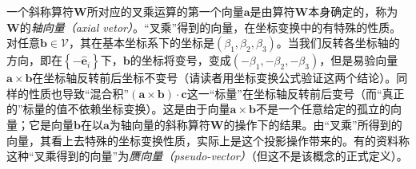 \documentclass[main.tex]{subfiles}
\begin{document}
一个斜称算符$\mathbf{W}$所对应的叉乘运算的第一个向量$\mathbf{a}$是由算符$\mathbf{W}$本身确定的，称为$\mathbf{W}$的\emph{轴向量（axial vetor）}。“叉乘”得到的向量，在坐标变换中的有特殊的性质。对任意$\mathbf{b}\in\mathcal{V}$，其在基本坐标系下的坐标是$\left(\beta_1,\beta_2,\beta_3\right)$。当我们反转各坐标轴的方向，即在$\left\{-\mathbf{\hat{e}}_i\right\}$下，$\mathbf{b}$的坐标将变号，变成$\left(-\beta_1,-\beta_2,-\beta_3\right)$，但是易验向量$\mathbf{a}\times\mathbf{b}$在坐标轴反转前后坐标不变号（请读者用坐标变换公式验证这两个结论）。同样的性质也导致“混合积”$\left(\mathbf{a}\times\mathbf{b}\right)\cdot\mathbf{c}$这一“标量”在坐标轴反转前后变号（而“真正的”标量的值不依赖坐标变换）。这是由于向量$\mathbf{a}\times\mathbf{b}$不是一个任意给定的孤立的向量；它是向量$\mathbf{b}$在以$\mathbf{a}$为轴向量的斜称算符$\mathbf{W}$的操作下的结果。由“叉乘”所得到的向量，其看上去特殊的坐标变换性质，实际上是这个投影操作带来的。有的资料称这种“叉乘得到的向量”为\emph{赝向量（pseudo-vector）}（但这不是该概念的正式定义）。
\end{document}

